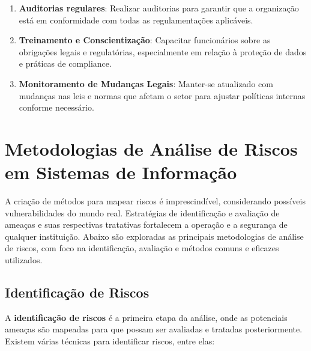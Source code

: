 \documentclass[12pt,oneside,a4paper,article]{abntex2}
\begin{document}
\begin{enumerate}
    \item \textbf{Auditorias regulares}: Realizar auditorias para garantir que a organização está em conformidade com todas as regulamentações aplicáveis.
    
    \item \textbf{Treinamento e Conscientização}: Capacitar funcionários sobre as obrigações legais e regulatórias, especialmente em relação à proteção de dados e práticas de compliance.
    
    \item \textbf{Monitoramento de Mudanças Legais}: Manter-se atualizado com mudanças nas leis e normas que afetam o setor para ajustar políticas internas conforme necessário.
\end{enumerate}



\newpage

\setcounter{section}{0}
\section{Metodologias de Análise de Riscos em Sistemas de Informação}

A criação de métodos para mapear riscos é imprescindível, considerando possíveis vulnerabilidades do mundo real. Estratégias de identificação e avaliação de ameaças e suas respectivas tratativas fortalecem a operação e a segurança de qualquer instituição. Abaixo são exploradas as principais metodologias de análise de riscos, com foco na identificação, avaliação e métodos comuns e eficazes utilizados.

\subsection{Identificação de Riscos}

A \textbf{identificação de riscos} é a primeira etapa da análise, onde as potenciais ameaças são mapeadas para que possam ser avaliadas e tratadas posteriormente. Existem várias técnicas para identificar riscos, entre elas:
\end{document}

